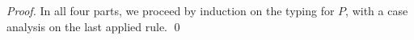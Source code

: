 \begin{proof}
	In all four parts, we proceed by induction on the typing for $P$,
	with a case analysis on the last applied rule. 
%
	\qed
\end{proof}

%

